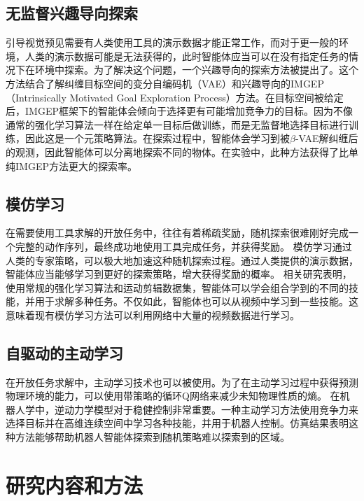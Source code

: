         \subsection{无监督兴趣导向探索}
        引导视觉预见需要有人类使用工具的演示数据才能正常工作，而对于更一般的环境，人类的演示数据可能是无法获得的，此时智能体应当可以在没有指定任务的情况下在环境中探索。为了解决这个问题，一个兴趣导向的探索方法被提出了\cite{laversanne-finot2018curiosity}。这个方法结合了解纠缠目标空间的变分自编码机（VAE）\cite{conf/nips/PuGHYLSC16}和兴趣导向的IMGEP（Intrinsically Motivated Goal Exploration Process）方法\cite{DBLP:journals/corr/abs-1708-02190}。在目标空间被给定后，IMGEP框架下的智能体会倾向于选择更有可能增加竞争力的目标。因为不像通常的强化学习算法一样在给定单一目标后做训练，而是无监督地选择目标进行训练，因此这是一个元策略算法。在探索过程中，智能体会学习到被$\beta$-VAE解纠缠后的观测，因此智能体可以分离地探索不同的物体。在实验中，此种方法获得了比单纯IMGEP方法更大的探索率。

        \subsection{模仿学习}
        在需要使用工具求解的开放任务中，往往有着稀疏奖励，随机探索很难刚好完成一个完整的动作序列，最终成功地使用工具完成任务，并获得奖励。
        模仿学习通过人类的专家策略，可以极大地加速这种随机探索过程。通过人类提供的演示数据，智能体应当能够学习到更好的探索策略，增大获得奖励的概率。
        相关研究表明，使用常规的强化学习算法和运动剪辑数据集，智能体可以学会组合学到的不同的技能，并用于求解多种任务\cite{peng2018deepmimic}。不仅如此，智能体也可以从视频中学习到一些技能\cite{peng2019sfv}。这意味着现有模仿学习方法可以利用网络中大量的视频数据进行学习。

        \subsection{自驱动的主动学习}
        在开放任务求解中，主动学习技术也可以被使用\cite{ren2020survey,conf/icml/EpshteynVD08,conf/nips/HoE16,conf/nips/DuanASHSSAZ17}。为了在主动学习过程中获得预测物理环境的能力，可以使用带策略的循环Q网络来减少未知物理性质的熵\cite{li2019active}。
        在机器人学中，逆动力学模型对于稳健控制非常重要。一种主动学习方法使用竞争力来选择目标并在高维连续空间中学习各种技能，并用于机器人控制\cite{baranes2013active}。仿真结果表明这种方法能够帮助机器人智能体探索到随机策略难以探索到的区域。

    \section{研究内容和方法}

